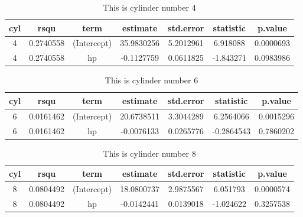 \documentclass[]{article}
\newenvironment{Shaded}{\begin{snugshade}}{\end{snugshade}}
\newcommand{\CommentTok}[1]{\textcolor[rgb]{0.56,0.35,0.01}{\textit{#1}}}
\begin{document}
\begin{table}[H]

\caption{\label{tab:three-tabs}\label{tab:cyl4}This is cylinder number 4}
\centering
\begin{tabular}[t]{ccccccc}
\toprule
cyl & rsqu & term & estimate & std.error & statistic & p.value\\
\midrule
4 & 0.2740558 & (Intercept) & 35.9830256 & 5.2012961 & 6.918088 & 0.0000693\\
4 & 0.2740558 & hp & -0.1127759 & 0.0611825 & -1.843271 & 0.0983986\\
\bottomrule
\end{tabular}
\end{table}\begin{table}[H]

\caption{\label{tab:three-tabs}\label{tab:cyl6}This is cylinder number 6}
\centering
\begin{tabular}[t]{ccccccc}
\toprule
cyl & rsqu & term & estimate & std.error & statistic & p.value\\
\midrule
6 & 0.0161462 & (Intercept) & 20.6738511 & 3.3044289 & 6.2564066 & 0.0015296\\
6 & 0.0161462 & hp & -0.0076133 & 0.0265776 & -0.2864543 & 0.7860202\\
\bottomrule
\end{tabular}
\end{table}\begin{table}[H]

\caption{\label{tab:three-tabs}\label{tab:cyl8}This is cylinder number 8}
\centering
\begin{tabular}[t]{ccccccc}
\toprule
cyl & rsqu & term & estimate & std.error & statistic & p.value\\
\midrule
8 & 0.0804492 & (Intercept) & 18.0800737 & 2.9875567 & 6.051793 & 0.0000574\\
8 & 0.0804492 & hp & -0.0142441 & 0.0139018 & -1.024622 & 0.3257538\\
\bottomrule
\end{tabular}
\end{table}

\begin{Shaded}
\end{Shaded}
\end{document}
